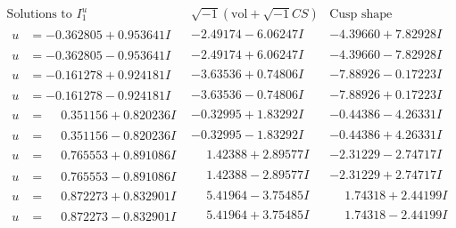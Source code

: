 \documentclass[1p]{elsarticle_modified}
\theoremstyle{definition}
\newcommand{\I}{\sqrt{-1}}
\begin{document}
$$\begin{array}{c|c|c}  
\text{Solutions to }I^u_{1}& \I (\text{vol} + \sqrt{-1}CS) & \text{Cusp shape}\\
 \hline 
\begin{aligned}
u &= -0.362805 + 0.953641 I\end{aligned}
 & -2.49174 - 6.06247 I & -4.39660 + 7.82928 I \\ \hline\begin{aligned}
u &= -0.362805 - 0.953641 I\end{aligned}
 & -2.49174 + 6.06247 I & -4.39660 - 7.82928 I \\ \hline\begin{aligned}
u &= -0.161278 + 0.924181 I\end{aligned}
 & -3.63536 + 0.74806 I & -7.88926 - 0.17223 I \\ \hline\begin{aligned}
u &= -0.161278 - 0.924181 I\end{aligned}
 & -3.63536 - 0.74806 I & -7.88926 + 0.17223 I \\ \hline\begin{aligned}
u &= \phantom{-}0.351156 + 0.820236 I\end{aligned}
 & -0.32995 + 1.83292 I & -0.44386 - 4.26331 I \\ \hline\begin{aligned}
u &= \phantom{-}0.351156 - 0.820236 I\end{aligned}
 & -0.32995 - 1.83292 I & -0.44386 + 4.26331 I \\ \hline\begin{aligned}
u &= \phantom{-}0.765553 + 0.891086 I\end{aligned}
 & \phantom{-}1.42388 + 2.89577 I & -2.31229 - 2.74717 I \\ \hline\begin{aligned}
u &= \phantom{-}0.765553 - 0.891086 I\end{aligned}
 & \phantom{-}1.42388 - 2.89577 I & -2.31229 + 2.74717 I \\ \hline\begin{aligned}
u &= \phantom{-}0.872273 + 0.832901 I\end{aligned}
 & \phantom{-}5.41964 - 3.75485 I & \phantom{-}1.74318 + 2.44199 I \\ \hline\begin{aligned}
u &= \phantom{-}0.872273 - 0.832901 I\end{aligned}
 & \phantom{-}5.41964 + 3.75485 I & \phantom{-}1.74318 - 2.44199 I \\ \hline\begin{aligned}

\end{aligned}
\end{array}$$
\end{document}
